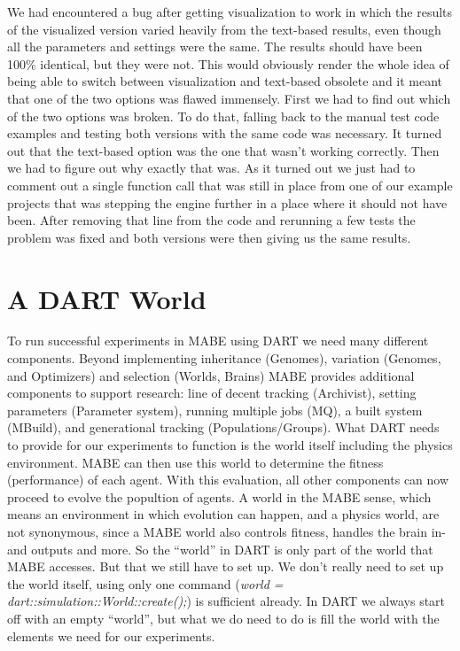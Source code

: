 \documentclass[12pt,oneside,listof=totoc,paper=a4,headings=small]{scrbook}
\begin{document}
We had encountered a bug after getting visualization to work in which the results of the visualized version varied heavily from the text-based results, even though all the parameters and settings were the same. The results should have been 100\% identical, but they were not. This would obviously render the whole idea of being able to switch between visualization and text-based obsolete and it meant that one of the two options was flawed immensely. First we had to find out which of the two options was broken. To do that, falling back to the manual test code examples and testing both versions with the same code was necessary. It turned out that the text-based option was the one that wasn't working correctly. Then we had to figure out why exactly that was. As it turned out we just had to comment out a single function call that was still in place from one of our example projects that was stepping the engine further in a place where it should not have been.
After removing that line from the code and rerunning a few tests the problem was fixed and both versions were then giving us the same results.


\section{A DART World}
To run successful experiments in MABE using DART we need many different components. Beyond implementing inheritance (Genomes), variation (Genomes, and Optimizers) and selection (Worlds, Brains) MABE provides additional components to support research: line of decent tracking (Archivist), setting parameters (Parameter system), running multiple jobs (MQ), a built system (MBuild), and generational tracking (Populations/Groups). What DART needs to provide for our experiments to function is the world itself including the physics environment. MABE can then use this world to determine the fitness (performance) of each agent. With this evaluation, all other components can now proceed to evolve the popultion of agents. A world in the MABE sense, which means an environment in which evolution can happen, and a physics world, are not synonymous, since a MABE world also controls fitness, handles the brain in- and outputs and more. So the ``world'' in DART is only part of the world that MABE accesses.
But that we still have to set up. 
We don't really need to set up the world itself, using only one command (\textit{world = dart::simulation::World::create();}) is sufficient already. In DART we always start off with an empty ``world'', but what we do need to do is fill the world with the elements we need for our experiments.
\end{document}
